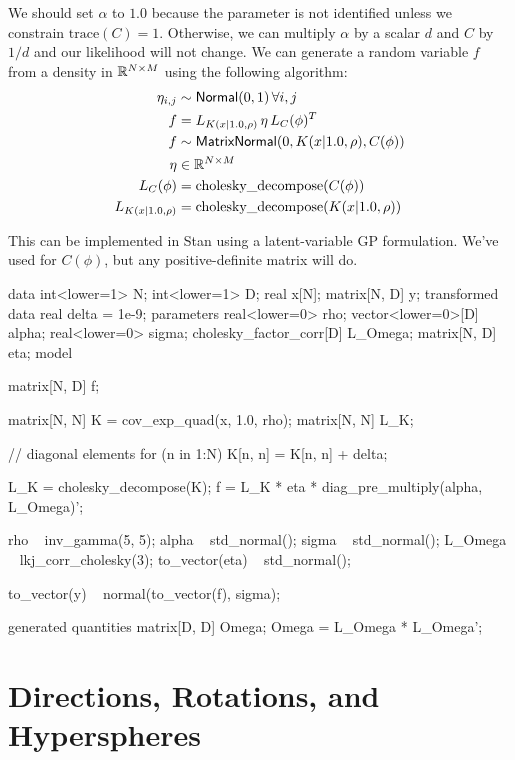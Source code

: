 We should set $\alpha$ to $1.0$ because the parameter is not identified unless
we constrain $\text{trace}(C) = 1$. Otherwise, we can multiply $\alpha$ by a scalar $d$ and
$C$ by $1/d$ and our likelihood will not change.
%
We can generate a random variable $f$ from a  density in
$\mathbb{R}^{N \times M}$ using the following algorithm:
%
\begin{align*}
  \eta_{i,j} & \sim \mbox{\sf Normal}(0, 1) \, \forall i,j \\
  f & = L_{K(x | 1.0, \rho)} \, \eta \, L_C(\phi)^T \\
  f & \sim \mbox{\sf MatrixNormal}(0, K(x | 1.0, \rho), C(\phi)) \\
  \eta & \in \mathbb{R}^{N \times M} \\
  L_C(\phi) & = \text{cholesky\_decompose}(C(\phi)) \\
  L_{K(x | 1.0, \rho)} & = \text{cholesky\_decompose}(K(x | 1.0, \rho))
\end{align*}

This can be implemented in Stan using a latent-variable GP formulation. We've used
 for $C(\phi)$, but any positive-definite matrix will do.


\begin{stancode}
data {
  int<lower=1> N;
  int<lower=1> D;
  real x[N];
  matrix[N, D] y;
}
transformed data {
  real delta = 1e-9;
}
parameters {
  real<lower=0> rho;
  vector<lower=0>[D] alpha;
  real<lower=0> sigma;
  cholesky_factor_corr[D] L_Omega;
  matrix[N, D] eta;
}
model {
  matrix[N, D] f;
  {
    matrix[N, N] K = cov_exp_quad(x, 1.0, rho);
    matrix[N, N] L_K;

    // diagonal elements
    for (n in 1:N)
      K[n, n] = K[n, n] + delta;

    L_K = cholesky_decompose(K);
    f = L_K * eta
        * diag_pre_multiply(alpha, L_Omega)';
  }

  rho ~ inv_gamma(5, 5);
  alpha ~ std_normal();
  sigma ~ std_normal();
  L_Omega ~ lkj_corr_cholesky(3);
  to_vector(eta) ~ std_normal();

  to_vector(y) ~ normal(to_vector(f), sigma);
}
generated quantities {
  matrix[D, D] Omega;
  Omega = L_Omega * L_Omega';
}
\end{stancode}

\chapter{Directions, Rotations, and Hyperspheres}

